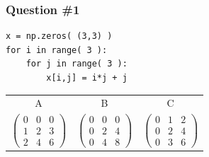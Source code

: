 \documentclass[11pt]{beamer}
\begin{document}
\begin{frame}[fragile]
  \frametitle{Question \#1}
  \Enlarge

  \begin{Verbatim}
x = np.zeros( (3,3) )
for i in range( 3 ):
    for j in range( 3 ):
        x[i,j] = i*j + j
  \end{Verbatim}

  \begin{center}
  \begin{tabular}{ccc}
    A & B & C \\
    $$
    \left(
    \begin{array}{ccc}
    0 & 0 & 0 \\
    1 & 2 & 3 \\
    2 & 4 & 6
    \end{array}
    \right)
    $$ &
    $$
    \left(
    \begin{array}{ccc}
    0 & 0 & 0 \\
    0 & 2 & 4 \\
    0 & 4 & 8
    \end{array}
    \right)
    $$ &
    $$
    \left(
    \begin{array}{ccc}
    0 & 1 & 2 \\
    0 & 2 & 4 \\
    0 & 3 & 6
    \end{array}
    \right)
    $$
  \end{tabular}
  \end{center}
\end{frame}
\end{document}

